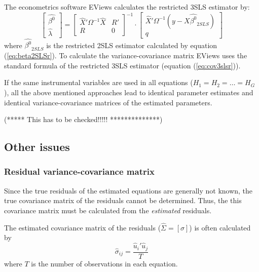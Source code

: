 \documentclass[article]{jss}
\begin{document}
The econometrics software EViews calculates the restricted 3SLS estimator by:
\begin{equation}
   \left[ \begin{array}{c}
      \widehat{\beta^0} \\ \widehat{\lambda}
   \end{array} \right]
   =
   \left[ \begin{array}{cc}
      \widehat{X}' \Omega^{-1} \widehat{X} & R' \\ 
      R & 0
   \end{array} \right]^{-1}
   \cdot
   \left[ \begin{array}{c}
      \widehat{X}' \Omega^{-1} \left( y - X \widehat{\beta^0}_{2SLS} \right) 
      \\ q 
   \end{array} \right]
\end{equation}
where $\widehat{\beta^0}_{2SLS}$ is the restricted 2SLS estimator calculated
by equation (\ref{eq:beta2SLSr}). 
To calculate the variance-covariance matrix 
EViews uses the standard formula of the restricted 3SLS estimator
(equation (\ref{eq:cov3slsr})).


If the same instrumental variables are used in all equations 
($H_1 = H_2 = \ldots = H_G$), 
all the above mentioned approaches lead to identical parameter estimates
and identical variance-covariance matrices of the estimated parameters.

(***** This has to be checked!!!!! **************)


\subsection{Other issues}


\subsubsection{Residual variance-covariance matrix}

Since the true residuals of the estimated equations are generally not known,
the true covariance matrix of the residuals cannot be determined.
Thus, the this covariance matrix must be calculated from the
\emph{estimated} residuals. 

The estimated covariance matrix of the residuals ($\widehat{\Sigma} = 
\left[ \sigma \right]$) 
is often calculated by
\begin{equation}
   \widehat{\sigma}_{ij} = \frac{ \widehat{u}_i' \widehat{u}_j }{ T }
   \label{eq:rcov0}
\end{equation}
where $T$ is the number of observations in each equation.
\end{document}

